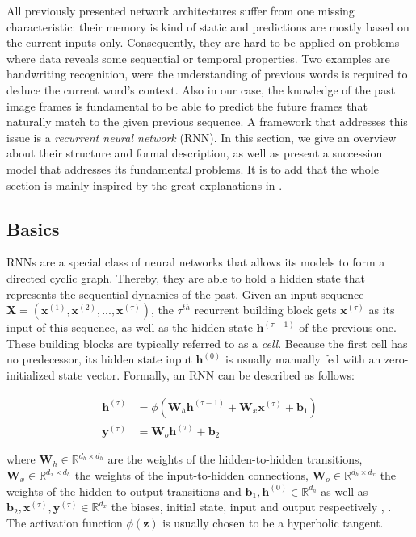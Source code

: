 All previously presented network architectures suffer from one missing characteristic: their memory is kind of static and predictions are mostly based on the current inputs only. Consequently, they are hard to be applied on problems where data reveals some sequential or temporal properties. Two examples are handwriting recognition, were the understanding of previous words is required to deduce the current word's context. Also in our case, the knowledge of the past image frames is fundamental to be able to predict the future frames that naturally match to the given previous sequence. A framework that addresses this issue is a \textit{recurrent neural network} (RNN). In this section, we give an overview about their structure and formal description, as well as present a succession model that addresses its fundamental problems. It is to add that the whole section is mainly inspired by the great explanations in \parencite{understand_lstm}.


\subsection{Basics}

RNNs are a special class of neural networks that allows its models to form a directed cyclic graph. Thereby, they are able to hold a hidden state that represents the sequential dynamics of the past. Given an input sequence $ \textbf{X} = (\textbf{x}^{(1)}, \textbf{x}^{(2)},..., \textbf{x}^{(\tau)}) $, the $ \tau^{th} $ recurrent building block gets $\textbf{x}^{(\tau)}$ as its input of this sequence, as well as the hidden state $\textbf{h}^{(\tau-1)}$ of the previous one. These building blocks are typically referred to as a \textit{cell}. Because the first cell has no predecessor, its hidden state input $ \textbf{h}^{(0)} $ is usually manually fed with an zero-initialized state vector. Formally, an RNN can be described as follows:

\begin{equation} \label{eq:rnn}
\begin{aligned}
\textbf{h}^{(\tau)} &= \phi(\textbf{W}_{h} \textbf{h}^{(\tau-1)} + \textbf{W}_{x} \textbf{x}^{(\tau)} + \textbf{b}_1) \\
\textbf{y}^{(\tau)} &= \textbf{W}_{o} \textbf{h}^{(\tau)} + \textbf{b}_2
\end{aligned}
\end{equation}

where $ \textbf{W}_{h} \in \mathbb{R}^{d_h \times d_h} $ are the weights of the hidden-to-hidden transitions, $ \textbf{W}_{x} \in \mathbb{R}^{d_x \times d_h} $ the weights of the input-to-hidden connections, $ \textbf{W}_{o} \in \mathbb{R}^{d_h \times d_x} $ the weights of the hidden-to-output transitions and $ \textbf{b}_1, \textbf{h}^{(0)} \in \mathbb{R}^{d_h}$ as well as $\textbf{b}_2, \textbf{x}^{(\tau)}, \textbf{y}^{(\tau)} \in \mathbb{R}^{d_x} $ the biases, initial state, input and output respectively \parencite[p. 2]{rnn-batchnorm}, \parencite[p. 381]{deep_learning}. The activation function $ \phi(\textbf{z}) $ is usually chosen to be a hyperbolic tangent.

